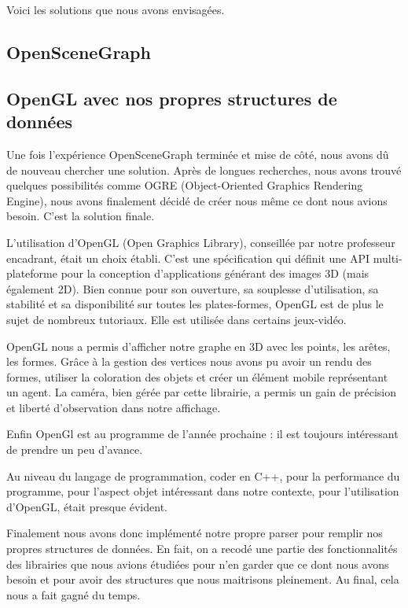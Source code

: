 \documentclass[a4paper,12pt]{report}
\begin{document}
Voici les solutions que nous avons envisagées.
 
\subsection{OpenSceneGraph}

\subsection{OpenGL avec nos propres structures de données}

Une fois l'expérience OpenSceneGraph terminée et mise de côté, nous avons dû de nouveau chercher une solution. Après de longues recherches, nous avons trouvé quelques possibilités comme OGRE (Object-Oriented Graphics Rendering Engine), nous avons finalement décidé de créer nous même ce dont nous avions besoin. C'est la solution finale.

L'utilisation d'OpenGL (Open Graphics Library), conseillée par notre professeur encadrant, était un choix établi. C'est une spécification qui définit une API multi-plateforme pour la conception d'applications générant des images 3D (mais également 2D). Bien connue pour son ouverture, sa souplesse d'utilisation, sa stabilité et sa disponibilité sur toutes les plates-formes, OpenGL est de plus le sujet de nombreux tutoriaux. Elle est utilisée dans certains jeux-vidéo.

OpenGL nous a permis d'afficher notre graphe en 3D avec les points, les arêtes, les formes. Grâce à la gestion des vertices nous avons pu avoir un rendu des formes, utiliser la coloration des objets et créer un élément mobile représentant un agent. La caméra, bien gérée par cette librairie, a permis un gain de précision et liberté d'observation dans notre affichage.

Enfin OpenGl est au programme de l'année prochaine : il est toujours intéressant de prendre un peu d'avance. 




Au niveau du langage de programmation, coder en C++, pour la performance du programme, pour l'aspect objet intéressant dans notre contexte, pour l'utilisation d'OpenGL, était presque évident.

Finalement nous avons donc implémenté notre propre parser pour remplir nos propres structures de données. En fait, on a recodé une partie des fonctionnalités des librairies que nous avions étudiées pour n'en garder que ce dont nous avons besoin et pour avoir des structures que nous maitrisons pleinement. Au final, cela nous a fait gagné du temps.
\end{document}
